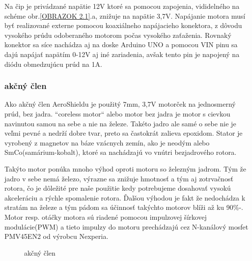  Na čip je privádzané napätie 12V ktoré sa pomocou zapojenia, vididelného na schéme obr.\ref{OBRAZOK 2.1}.a, znižuje na napätie 3,7V. Napájanie motora musí byť realizované externe pomocou koaxiálneho napájacieho konektora, z dôvodu vysokého prúdu odoberaného motorom počas vysokého zaťaženia. Rovnaký konektor sa síce nachádza aj na doske Arduino UNO a pomocou VIN pinu sa dajú napájať napätím 0-12V aj iné zariadenia, avšak tento pin je napojený na diódu obmedzujúcu prúd na 1A\cite{ampere}\cite{ampere2}.



\subsubsection{akčný člen}
\label{akcclen}

Ako akčný člen AeroShieldu je použitý 7mm, 3,7V motorček na jednosmerný prúd, bez jadra. “coreless motor“ alebo motor bez jadra je motor s cievkou navinutou samou na sebe a nie na železe\cite{coreless}. Takéto jadro ale samé o sebe nie je veľmi pevné a nedrží dobre tvar, preto sa častokrát zalieva epoxidom. Stator je vyrobený z magnetov na báze vzácnych zemín, ako je neodým alebo SmCo(samárium-kobalt), ktoré sa nachádzajú vo vnútri bezjadrového rotora.

Takýto motor ponúka mnoho výhod oproti motoru so železným jadrom. Tým že jadro v sebe nemá železo, výrazne sa znižuje hmotnosť a tým aj zotrvačnosť rotora, čo je dôležité pre naše použitie kedy potrebujeme dosahovať vysokú akceleráciu a rýchle spomalenie rotora. Ďalšou výhodou je fakt že nedochádza k stratám na železe a tým pádom sa účinnosť takýchto motorov blíži až ku 90\%-\cite{5545147}. Motor resp. otáčky motora sú riadené pomocou impulzovej šírkovej modulácie(PWM) a tieto impulzy do motoru prechádzajú cez N-kanálový mosfet PMV45EN2 od výrobcu Nexperia\cite{pmv}.



\begin{figure}[!tbh]
\hfill
{}
\hfill
{}
\hfill
\caption{akčný člen}\label{OBRAZOK 2.3}
\end{figure}


